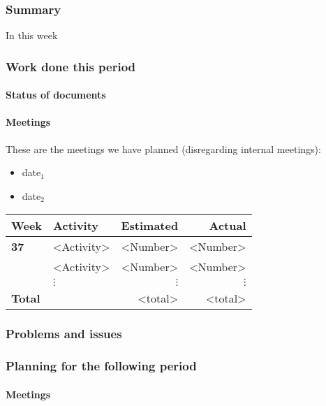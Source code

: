 \subsubsection{Summary}
In this week
\subsubsection{Work done this period}
\paragraph{Status of documents}
\paragraph{Meetings}
These are the meetings we have planned (disregarding internal meetings):\\
\begin{itemize}
\item date$_1$
\item date$_2$
\end{itemize}
  \begin{tabular}{| l | l | r | r |}
    \hline
    \textbf{Week} & \textbf{Activity} & \textbf{Estimated} & \textbf{Actual}\\ \hline
    \textbf{37} & <Activity> & <Number> & <Number> \\ \hline
     & <Activity> & <Number> & <Number> \\ \hline
     & $\vdots$ & $\vdots$ & $\vdots$ \\ \hline
     \textbf{Total }&  & <total> & <total> \\
    \hline
  \end{tabular}

\subsubsection{Problems and issues}

\subsubsection{Planning for the following period}
\paragraph{Meetings}
\newpage
